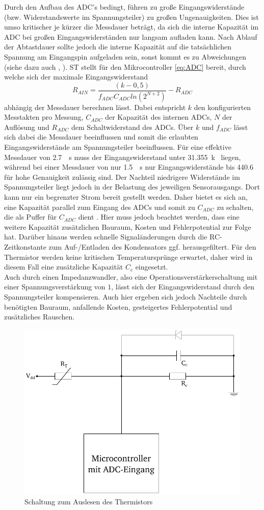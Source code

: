 Durch den Aufbau des ADC's bedingt, führen zu große Eingangswiderstände (bzw. Widerstandswerte im Spannungsteiler) zu großen Ungenauigkeiten. Dies ist umso kritischer je kürzer die Messdauer beträgt, da sich die interne Kapazität im ADC bei großen Eingangswiderständen nur langsam aufladen kann. Nach Ablauf der Abtastdauer sollte  jedoch die interne Kapazität auf die tatsächlichen Spannung am Eingangspin aufgeladen sein, sonst kommt es zu Abweichungen (siehe dazu auch \cite{ADC}, \cite{stm32}). ST stellt für den Mikrocontroller \autoref{eq:ADC} bereit, durch welche sich der maximale Eingangswiderstand 
\begin{equation} \label{eq:ADC}
R_{AIN} = \frac{(k-0,5)}{f_{ADC} C_{ADC} ln(2^{N+2})} - R_{ADC}
\end{equation}
abhängig der Messdauer berechnen lässt. Dabei entspricht $k$ den konfigurierten Messtakten pro Messung, $C_{ADC}$ der Kapazität des internen ADCs, $N$ der Auflösung und $R_{ADC}$ dem Schaltwiderstand des ADCs. Über $k$ und $f_{ADC}$ lässt sich dabei die Messdauer beeinflussen und somit die erlaubten Eingangswiderstände am Spannungsteiler beeinflussen. Für eine effektive Messdauer von \SI{2,7}{\mu s} muss der Eingangswiderstand unter \SI{31,355}{k\Omega} liegen, während bei einer Messdauer von nur \SI{1,5}{\mu s} nur Eingangswiderstände bis \SI{440,6}{\Omega} für hohe Genauigkeit zulässig sind. Der Nachteil niedrigere Widerstände im Spannungsteiler liegt jedoch in der Belastung des jeweiligen Sensorausgangs. Dort kann nur ein begrenzter Strom bereit gestellt werden. Daher bietet es sich an, eine Kapazität parallel zum Eingang des ADCs und somit zu $C_{ADC}$ zu schalten, die als Puffer für $C_{ADC}$ dient \cite{ADC}. Hier muss jedoch beachtet werden, dass eine weitere Kapazität zusätzlichen Bauraum, Kosten und Fehlerpotential zur Folge hat. Darüber hinaus werden schnelle Signaländerungen durch die RC-Zeitkonstante zum Auf-/Entladen des Kondensators ggf. herausgefiltert. Für den Thermistor werden keine kritischen Temperatursprünge erwartet, daher wird in diesem Fall eine zusätzliche Kapazität $C_c$ eingesetzt.\\
Auch durch einen Impedanzwandler, also eine Operationsverstärkerschaltung mit einer Spannungsverstärkung von $1$, lässt sich der Eingangswiderstand durch den Spannungsteiler kompensieren. Auch hier ergeben sich jedoch Nachteile durch benötigten Bauraum, anfallende Kosten, gesteigertes Fehlerpotential und zusätzliches Rauschen.\\
\begin{figure}[H]
	\centering
	\includegraphics[width=0.5\linewidth]{./Bilder/fig_ther_elek}
	\caption{Schaltung zum Auslesen des Thermistors}
	\label{fig_ther_elek}
\end{figure}\noindent
